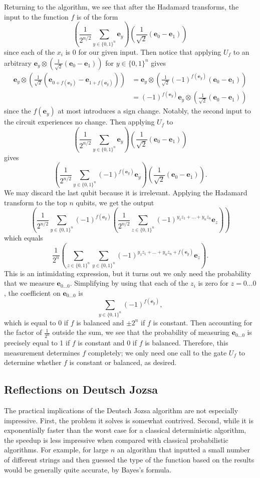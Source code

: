 \documentclass[a4paper]{article}
\newcommand\0{\mathbf{0}}
\newcommand\ee{\mathbf{e}}
\newcommand\<{\langle}
\renewcommand\>{\rangle}
\begin{document}
Returning to the algorithm, we see that after the Hadamard transforms, the input to the function $f$ is of the form
$$\left( \frac{1}{2^{n/2}} \sum_{y\in\{0,1\}^{n}} \ee_y \right)\left(\frac{1}{\sqrt{2}}(\ee_0-\ee_1)\right)$$ since each of the $x_i$ is $0$ for our given input.
Then notice that applying $U_f$ to an arbitrary $\ee_y\otimes\left(\frac{1}{\sqrt{2}} (\ee_0-\ee_1)\right)$ for $y\in\{0,1\}^n$ gives 
\begin{align*}
\ee_y\otimes\left(\frac{1}{\sqrt{2}} (\ee_{0+f(\ee_y)} - \ee_{1+f(\ee_y)})\right) &=  \ee_y \otimes \left( \frac{1}{\sqrt{2}} (-1)^{f(\ee_y)} (\ee_0-\ee_1)\right) \\
&= (-1)^{f(\ee_y)} \ee_y \otimes \left( \frac{1}{\sqrt{2}} (\ee_0-\ee_1)\right)
\end{align*}
since the $f(\ee_y)$ at most introduces a sign change. Notably, the second input to the circuit experiences no change. Then applying $U_f$ to $$\left( \frac{1}{2^{n/2}} \sum_{y\in\{0,1\}^{n}} \ee_y \right)\left(\frac{1}{\sqrt{2}}(\ee_0-\ee_1)\right)$$ 
gives $$\left( \frac{1}{2^{n/2}} \sum_{y\in\{0,1\}^{n}} (-1)^{f(\ee_y)}\ee_y \right)\left(\frac{1}{\sqrt{2}}(\ee_0-\ee_1)\right).$$
We may discard the last qubit because it is irrelevant. Applying the Hadamard transform to the top $n$ qubits, we get the output
$$\left( \frac{1}{2^{n/2}} \sum_{y\in\{0,1\}^{n}} (-1)^{f(\ee_y)}\left( \frac{1}{2^{n/2}} \sum_{z\in \{0,1\}^n} (-1)^{y_1z_1+\dots+y_nz_n} \ee_z \right) \right) $$
which equals 
$$\frac{1}{2^n}\left(\sum_{z\in\{0,1\}^n}\sum_{y\in\{0,1\}^n} (-1)^{y_1z_1+\dots+y_nz_n + f(\ee_y)} \ee_z \right). $$ 
This is an intimidating expression, but it turns out we only need the probability that we measure $\ee_{0\dots 0}$. Simplifying by using that each of the $z_i$ is zero for $z=0\dots 0$, the coefficient on $\ee_{0\dots 0}$ is $$\sum_{y\in\{0,1\}^n} (-1)^{f(\ee_y)},$$ which is equal to 0 if $f$ is balanced and $\pm 2^n$ if $f$ is constant. Then accounting for the factor of $\frac{1}{2^n}$ outside the sum, we see that the probability of measuring $\ee_{0\dots 0}$ is precisely equal to 1 if $f$ is constant and 0 if $f$ is balanced. Therefore, this measurement determines $f$ completely; we only need one call to the gate $U_f$ to determine whether $f$ is constant or balanced, as desired.

\subsection{Reflections on Deutsch Jozsa}

The practical implications of the Deutsch Jozsa algorithm are not especially impressive. First, the problem it solves is somewhat contrived. Second, while it is exponentially faster than the worst case for a classical deterministic algorithm, the speedup is less impressive when compared with classical probabilistic algorithms. For example, for large $n$ an algorithm that inputted a small number of different strings and then guessed the type of the function based on the results would be generally quite accurate, by Bayes's formula. 
\end{document}
